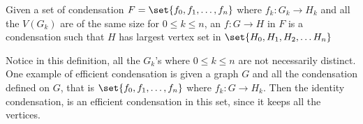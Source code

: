 \begin{definition}
  Given a set of condensation \(F = \set{f_0, f_1, \ldots, f_n}\)
  where \(f_k: G_k \to H_k\)
  and all the \(V(G_k)\) are of the same size for \(0 \leq k \leq n\),
  an  \(f: G \to H\) in \(F\)
  is a condensation such that
  \(H\) has largest vertex set in
  \(\set{H_0, H_1, H_2, \ldots H_n}\)
\end{definition}

Notice in this definition,
all the \(G_k\)'s where \(0 \leq k \leq n\) are not
necessarily distinct.
One example of efficient condensation is
given a graph \(G\) and all the condensation defined on \(G\),
that is  \(\set{f_0, f_1, \ldots, f_n}\) where \(f_k: G \to H_k\).
Then the identity condensation,
is an efficient condensation in this set,
since it keeps all the vertices.
